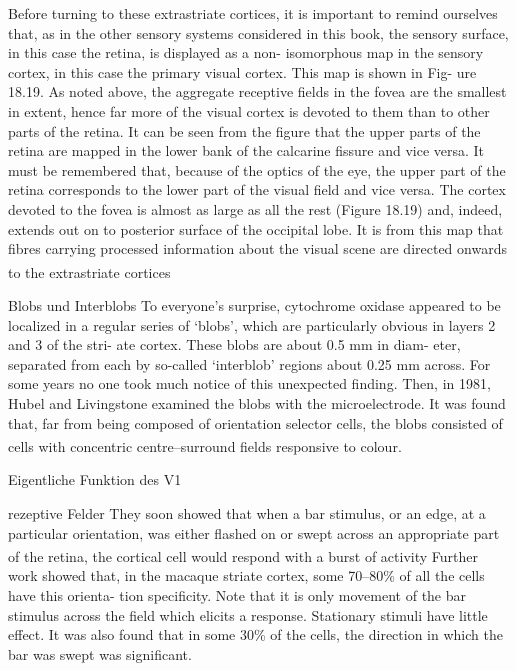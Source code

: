 \documentclass[12pt,a4paper,pdftex]{article}
\begin{document}
Before turning to these extrastriate cortices, it is
important to remind ourselves that, as in the other
sensory systems considered in this book, the sensory
surface, in this case the retina, is displayed as a non-
isomorphous map in the sensory cortex, in this case
the primary visual cortex. This map is shown in Fig-
ure 18.19. As noted above, the aggregate receptive
fields in the fovea are the smallest in extent, hence
far more of the visual cortex is devoted to them than
to other parts of the retina. It can be seen from the
figure that the upper parts of the retina are mapped in
the lower bank of the calcarine fissure and vice versa.
It must be remembered that, because of the optics of
the eye, the upper part of the retina corresponds to
the lower part of the visual field and vice versa. The
cortex devoted to the fovea is almost as large as all
the rest (Figure 18.19) and, indeed, extends out on
to posterior surface of the occipital lobe. It is from
this map that fibres carrying processed information
about the visual scene are directed onwards to the
extrastriate cortices \textsuperscript{\cite[18]{smith2008biology}}


Blobs und Interblobs
To everyone’s surprise, cytochrome oxidase appeared to
be localized in a regular series of ‘blobs’, which are
particularly obvious in layers 2 and 3 of the stri-
ate cortex. These blobs are about 0.5 mm in diam-
eter, separated from each by so-called ‘interblob’
regions about 0.25 mm across. For some years no
one took much notice of this unexpected finding.
Then, in 1981, Hubel and Livingstone examined the
blobs with the microelectrode. It was found that,
far from being composed of orientation selector
cells, the blobs consisted of cells with concentric
centre–surround fields responsive to colour. \textsuperscript{\cite[18]{smith2008biology}}

Eigentliche Funktion des V1

rezeptive Felder 
They soon showed that when a bar stimulus, or an
edge, at a particular orientation, was either flashed on
or swept across an appropriate part of the retina, the
cortical cell would respond with a burst of activity
\textsuperscript{\cite[18]{smith2008biology}}
Further work showed that, in the macaque striate
cortex, some 70–80\% of all the cells have this orienta-
tion specificity. Note that it is only movement of the
bar stimulus across the field which elicits a response.
Stationary stimuli have little effect. It was also found
that in some 30\% of the cells, the direction in which
the bar was swept was significant.
\end{document}
